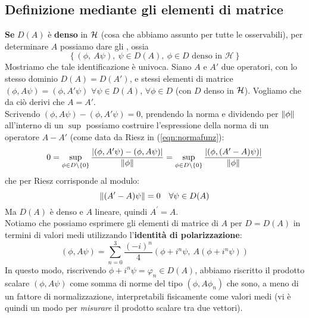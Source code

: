 \documentclass[FisicaTeorica.tex]{subfiles}
\begin{document}
\subsection{Definizione mediante gli elementi di matrice}
\textbf{Se} $D(A)$ è \textbf{denso} in $\mathcal{H}$ (cosa che abbiamo assunto per tutte le osservabili), per determinare $A$ possiamo dare gli , ossia 
\[
\left\{\left(\phi,\ A\psi\right),\ \psi\in D\left(A\right),\ \phi\in D\text{\ denso\ in\ }\mathcal{H}\right\}
\]
Mostriamo che tale identificazione è univoca. Siano $A$ e $A'$ due operatori, con lo stesso dominio $D(A) = D(A')$, e stessi elementi di matrice $(\phi, A\psi) = (\phi, A'\psi)$ $\forall \psi \in D(A)$, $\forall \phi \in D$ (con $D$ denso in $\mathcal{H}$). Vogliamo che da ciò derivi che $A = A'$.\\
Scrivendo $(\phi, A\psi)-(\phi, A'\psi) = 0$, prendendo la norma e dividendo per $\left\lVert\phi\right\rVert$ all'interno di un $\sup$ possiamo costruire l'espressione della norma di un operatore $A-A'$ (come data da Riesz in (\ref{eqn:normafunz}): 
\[ 0 = \sup_{\phi \in D\setminus \{0\}}\frac{|(\phi, A'\psi)-(\phi, A\psi)|}{\left\lVert\phi\right\rVert} = \sup_{\phi\in D\setminus\{0\}} \frac{|(\phi, (A'-A)\psi)|}{\left\lVert\phi\right\rVert}
\]
che per Riesz corrisponde al modulo: %
\[
\left\lVert(A'-A)\psi\right\rVert = 0 \quad \forall \psi \in D(A)
\] 
	Ma $D(A)$ è denso e $A$ lineare, quindi $A^\prime=A$.\\
	Notiamo che possiamo esprimere gli elementi di matrice di $A$ per $D=D(A)$ in termini di valori medi utilizzando l'\textbf{identità di polarizzazione}:
	\[
	\left(\phi, A\psi\right)= \sum_{n=0}^{3}{\frac{\left(-i\right)^n}{4}(\phi+i^n\psi,\ A\left(\phi+i^n\psi\right))}
	\]
	In questo modo, riscrivendo $\phi + i^n\psi = \varphi_n \in D(A)$, abbiamo riscritto il prodotto scalare $(\phi, A\psi)$ come somma di norme del tipo $(\phi, A\phi_n)$ che sono, a meno di un fattore di normalizzazione, interpretabili fisicamente come valori medi (vi è quindi un modo per \textit{misurare} il prodotto scalare tra due vettori).
\end{document}

